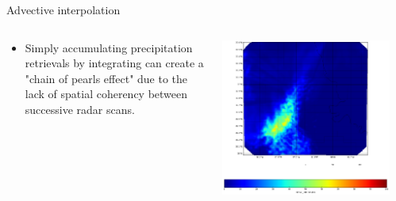\documentclass[final]{beamer}
\begin{document}
\begin{frame}{}
\begin{columns}[t]
\begin{column}{.3\linewidth}
    \end{column}
  \begin{column}{.3\linewidth}
  \vfill
   \begin{block}{Advective interpolation}
 	\begin{columns}[t]
		\begin{column}{.5\linewidth}
		\begin{itemize}
		\item Simply accumulating precipitation retrievals by integrating can create a "chain of pearls effect" due to the lack of spatial coherency between successive radar scans.
		\end{itemize}
		\end{column}
                \begin{column}{.5\linewidth}
           		\includegraphics[width=1.0\linewidth]{figures/basic_accumulation.png}\\[1ex]     

\end{column}
\end{columns}
\end{block}
\end{column}
\end{columns}
\end{frame}
\end{document}
